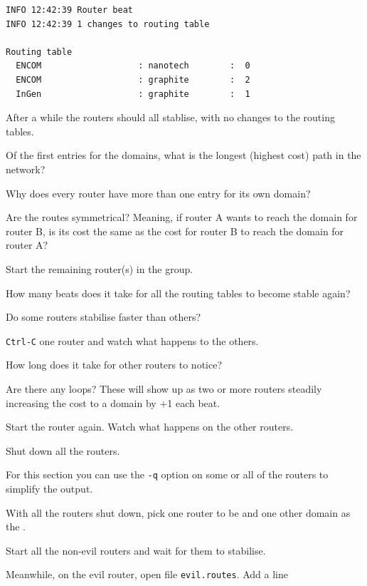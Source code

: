 \begin{CODE}\begin{verbatim}
INFO 12:42:39 Router beat 
INFO 12:42:39 1 changes to routing table 

Routing table
  ENCOM                   : nanotech        :  0
  ENCOM                   : graphite        :  2
  InGen                   : graphite        :  1
\end{verbatim}\end{CODE}

After a while the routers should all stablise, with no changes to
the routing tables.

Of the first entries for the domains, what is the longest
(highest cost) path in the network?

Why does every router have more than one entry for its own domain?

Are the routes symmetrical? Meaning, if router A wants to
reach the domain for router B, is its cost the same as the cost
for router B to reach the domain for router A?


\STEP
Start the remaining router(s) in the group.

How many beats does it take for all the routing tables to
become stable again?

Do some routers stabilise faster than others?


\STEP
\texttt{Ctrl-C} one router and watch what happens to the others.

How long does it take for other routers to notice?

Are there any  loops? These will
show up as two or more routers steadily increasing the cost to
a domain by +1 each beat.


\STEP
Start the router again. Watch what happens on the other routers.


\STEP
Shut down all the routers.



For this section you can use the \texttt{-q} option on some or
all of the routers to simplify the output.

With all the routers shut down, pick one router to be 
and one other domain as the .

Start all the non-evil routers and wait for them to stabilise.

Meanwhile, on the evil router, open file \texttt{evil.routes}.
Add a line


